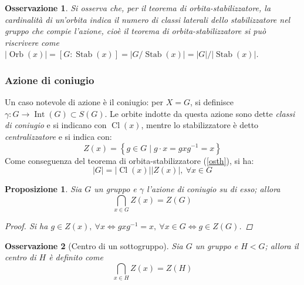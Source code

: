 \documentclass[12pt]{scrartcl}
\theoremstyle{style}
\newtheorem{prop}{Proposizione}[section]
\newtheorem{osservazione}{Osservazione}[section]
\numberwithin{equation}{subsection}
\begin{document}
\begin{osservazione}
Si osserva che, per il teorema di orbita-stabilizzatore, la cardinalit\`a di un'orbita indica il numero di classi laterali dello stabilizzatore nel gruppo che compie l'azione, cio\`e il teorema di orbita-stabilizzatore si pu\`o riscrivere come $\lvert \operatorname{Orb} (x) \rvert = [G: \operatorname{Stab} (x)] = \lvert G / \operatorname{Stab} (x) \rvert = \lvert G \rvert / \lvert \operatorname{Stab} (x) \rvert $.
\end{osservazione}


\subsubsection{Azione di coniugio}
 Un caso notevole di azione \`e il coniugio: per $X=G$, si definisce $\gamma : G \to \operatorname{Int} (G) \subset S(G)$.
Le orbite indotte da questa azione sono dette \textit{classi di coniugio} e si indicano con $\operatorname{Cl} (x)$, mentre lo stabilizzatore \`e detto \textit{centralizzatore} e si indica con:
\begin{equation}
	Z(x) = \left\{ g \in G  \mid g \cdot x = gxg^{-1} = x \right\} 
\end{equation}
Come conseguenza del teorema di orbita-stabilizzatore (\ref{osth}), si ha:
\begin{equation}
	\lvert G \rvert  = \lvert \operatorname{Cl} (x)  \rvert  \lvert Z(x) \rvert , \ \forall x \in G
\end{equation}
\begin{prop}
	Sia $G$ un gruppo e $\gamma$ l'azione di coniugio su di esso; allora
	\[
	\bigcap_{x \in G} Z(x) = Z(G)
	\] 
	\begin{proof}
		Si ha $g \in Z(x), \ \forall x \iff gxg^{-1} =x , \ \forall x \in G \iff g \in Z(G)$.
	\end{proof}
\end{prop}
\begin{osservazione}
	[Centro di un sottogruppo]
	Sia $G$ un gruppo e $H < G$; allora il centro di $H$ \`e definito come 
	\[
	\bigcap_{x \in H}  Z(x) = Z(H)
	\] 
\end{osservazione}
\end{document}

